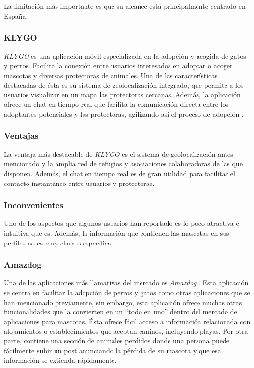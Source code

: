\documentclass[a4paper, 12pt]{article}
\begin{document}
La limitación más importante es que su alcance está principalmente centrado en España. 

\subsubsection*{KLYGO}

\textit{KLYGO} es una aplicación móvil especializada en la adopción y acogida de gatos y perros. Facilita la conexión entre usuarios interesados en adoptar o acoger mascotas y diversas protectoras de animales. Una de las características destacadas de ésta es su sistema de geolocalización integrado, que permite a los usuarios visualizar en un mapa las protectoras cercanas. Además, la aplicación ofrece un chat en tiempo real que facilita la comunicación directa entre los adoptantes potenciales y las protectoras, agilizando así el proceso de adopción \cite{klygo}.

\subsubsection*{Ventajas}

La ventaja más destacable de \textit{KLYGO} es el sistema de geolocalización antes mencionado y la amplia red de refugios y asociaciones colaboradoras de las que disponen. Además, el chat en tiempo real es de gran utilidad para facilitar el contacto instantáneo entre usuarios y protectoras.

\subsubsection*{Inconvenientes}

Uno de los aspectos que algunos usuarios han reportado es lo poco atractiva e intuitiva que es. Además, la información que contienen las mascotas en sus perfiles no es muy clara o específica.

\subsubsection*{Amazdog}

Una de las aplicaciones más llamativas del mercado es \textit{Amazdog} \cite{amazdog}. Esta aplicación se centra en facilitar la adopción de perros y gatos como otras aplicaciones que se han mencionado previamente, sin embargo, esta aplicación ofrece muchas otras funcionalidades que la convierten en un ``todo en uno'' dentro del mercado de aplicaciones para mascotas. Ésta ofrece fácil acceso a información relacionada con alojamientos o establecimientos que aceptan caninos, incluyendo playas. Por otra parte, contiene una sección de animales perdidos donde una persona puede fácilmente subir un post anunciando la pérdida de su mascota y que esa información se extienda rápidamente.
\end{document}
